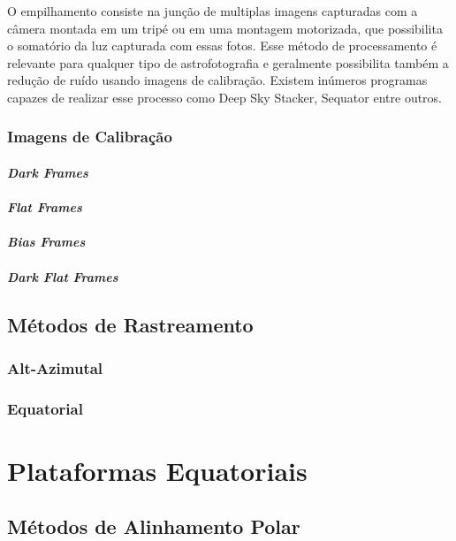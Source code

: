 O empilhamento consiste na junção de multiplas imagens capturadas com a câmera montada em um tripé ou em uma montagem motorizada, que possibilita o somatório da luz capturada com essas fotos. Esse método de processamento é relevante para qualquer tipo de astrofotografia e geralmente possibilita também a redução de ruído usando imagens de calibração.\cite{book:bbcsky} Existem inúmeros programas capazes de realizar esse processo como Deep Sky Stacker, Sequator entre outros.

\subsubsection{Imagens de Calibração}

\paragraph{\textit{Dark Frames}}
\paragraph{\textit{Flat Frames}}
\paragraph{\textit{Bias Frames}}
\paragraph{\textit{Dark Flat Frames}}



\subsection{Métodos de Rastreamento}


\subsubsection{Alt-Azimutal}
\subsubsection{Equatorial}

\section{Plataformas Equatoriais}

\subsection{Métodos de Alinhamento Polar}

